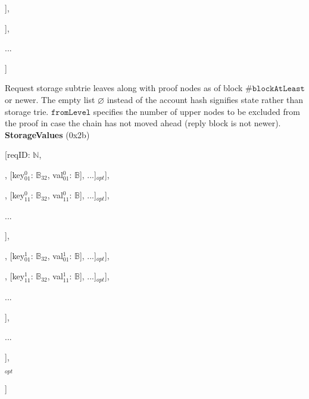 \documentclass{amsart}
\begin{document}
\quad [addressHash$^0$: $\mathbb{B}_{32}$, [prefix$^0_0$: $\mathbb{Y}$, prefix$^0_1$: $\mathbb{Y}$, ...]],

\quad [addressHash$^1$: $\mathbb{B}_{32}$, [prefix$^1_0$: $\mathbb{Y}$, prefix$^1_1$: $\mathbb{Y}$, ...]],

\quad ...

]
\medskip

Request storage subtrie leaves along with proof nodes as of block \#$\texttt{blockAtLeast}$ or newer.
The empty list $\varnothing$ instead of the account hash signifies state rather than storage trie.
$\texttt{fromLevel}$ specifies the number of upper nodes to be excluded from the proof in case the chain has not moved ahead
(reply block is not newer).\\

\textbf{StorageValues} (0x2b)

[reqID: $\mathbb{N}$,

\quad [

\qquad [

\quad \qquad [status$^0_0$, [[key$^0_{00}$: $\mathbb{B}_{32}$, val$^0_{00}$: $\mathbb{B}$], [key$^0_{01}$: $\mathbb{B}_{32}$, val$^0_{01}$: $\mathbb{B}$], ...]$_{opt}$],

\quad \qquad [status$^0_1$, [[key$^0_{10}$: $\mathbb{B}_{32}$, val$^0_{10}$: $\mathbb{B}$], [key$^0_{11}$: $\mathbb{B}_{32}$, val$^0_{11}$: $\mathbb{B}$], ...]$_{opt}$],

\quad \qquad ...

\qquad ],

\qquad [

\quad \qquad [status$^1_0$, [[key$^1_{00}$: $\mathbb{B}_{32}$, val$^1_{00}$: $\mathbb{B}$], [key$^1_{01}$: $\mathbb{B}_{32}$, val$^1_{01}$: $\mathbb{B}$], ...]$_{opt}$],

\quad \qquad [status$^1_1$, [[key$^1_{10}$: $\mathbb{B}_{32}$, val$^1_{10}$: $\mathbb{B}$], [key$^1_{11}$: $\mathbb{B}_{32}$, val$^1_{11}$: $\mathbb{B}$], ...]$_{opt}$],

\quad \qquad ...

\qquad ],

\qquad ...

\quad ],

\quad [avalableState$_0$, ...]$_{opt}$

]
\medskip
\end{document}
